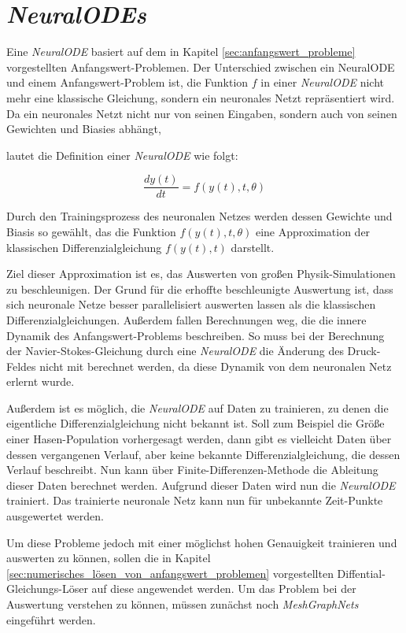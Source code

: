 
\section{\textit{NeuralODEs}} \label{sec:neural_ode}

Eine \textit{NeuralODE} \cite{neuralode} basiert auf dem in Kapitel \ref{sec:anfangswert_probleme} vorgestellten Anfangswert-Problemen.
Der Unterschied zwischen ein NeuralODE und einem Anfangswert-Problem ist, 
die Funktion $f$ in einer \textit{NeuralODE} nicht mehr eine klassische Gleichung, sondern ein 
neuronales Netzt repräsentiert wird.
Da ein neuronales Netzt nicht nur von seinen Eingaben, sondern auch von seinen Gewichten und Biasies abhängt,

lautet die Definition einer \textit{NeuralODE} wie folgt:

$$
\frac{d y(t)}{dt} = f(y(t), t, \theta)
$$

Durch den Trainingsprozess des neuronalen Netzes werden dessen Gewichte und Biasis 
so gewählt, das die Funktion $f(y(t), t, \theta)$ eine Approximation der klassischen 
Differenzialgleichung $f(y(t), t)$ darstellt.

Ziel dieser Approximation ist es, das Auswerten von großen Physik-Simulationen zu beschleunigen.
Der Grund für die erhoffte beschleunigte Auswertung ist, dass sich neuronale Netze besser parallelisiert auswerten lassen
als die klassischen Differenzialgleichungen.
Außerdem fallen Berechnungen weg, die die innere Dynamik des Anfangswert-Problems beschreiben.
So muss bei der Berechnung der Navier-Stokes-Gleichung durch eine \textit{NeuralODE} die Änderung des Druck-Feldes 
nicht mit berechnet werden, da diese Dynamik von dem neuronalen Netz erlernt wurde.

Außerdem ist es möglich, die \textit{NeuralODE} auf Daten zu trainieren, 
zu denen die eigentliche Differenzialgleichung nicht bekannt ist.
Soll zum Beispiel die Größe einer Hasen-Population vorhergesagt werden, dann gibt es vielleicht Daten über dessen 
vergangenen Verlauf, aber keine bekannte Differenzialgleichung, die dessen Verlauf beschreibt.
Nun kann über Finite-Differenzen-Methode die Ableitung dieser Daten berechnet werden.
Aufgrund dieser Daten wird nun die \textit{NeuralODE} trainiert.
Das trainierte neuronale Netz kann nun für unbekannte Zeit-Punkte ausgewertet werden.

Um diese Probleme jedoch mit einer möglichst hohen Genauigkeit trainieren und auswerten zu können,
sollen die in Kapitel \ref{sec:numerisches_lösen_von_anfangswert_problemen} vorgestellten Diffential-Gleichungs-Löser auf diese angewendet werden.
Um das Problem bei der Auswertung verstehen zu können, müssen zunächst noch \textit{MeshGraphNets} eingeführt werden.






